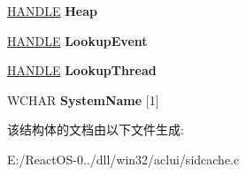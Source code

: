 \begin{DoxyCompactItemize}
\hyperlink{interfacevoid}{H\+A\+N\+D\+LE} {\bfseries Heap}
\item 
\mbox{\label{struct___s_i_d_c_a_c_h_e_m_g_r_a466af2978842d04a6a948a89aba93b7c}} 
\hyperlink{interfacevoid}{H\+A\+N\+D\+LE} {\bfseries Lookup\+Event}
\item 
\mbox{\label{struct___s_i_d_c_a_c_h_e_m_g_r_aee1106fc25522225470c9a891e763142}} 
\hyperlink{interfacevoid}{H\+A\+N\+D\+LE} {\bfseries Lookup\+Thread}
\item 
\mbox{\label{struct___s_i_d_c_a_c_h_e_m_g_r_a400b08244be7fc17bae76e3a760c3af5}} 
W\+C\+H\+AR {\bfseries System\+Name} \mbox{[}1\mbox{]}
\end{DoxyCompactItemize}


该结构体的文档由以下文件生成\+:\begin{DoxyCompactItemize}
\item 
E\+:/\+React\+O\+S-\/0../dll/win32/aclui/sidcache.\+c\end{DoxyCompactItemize}
